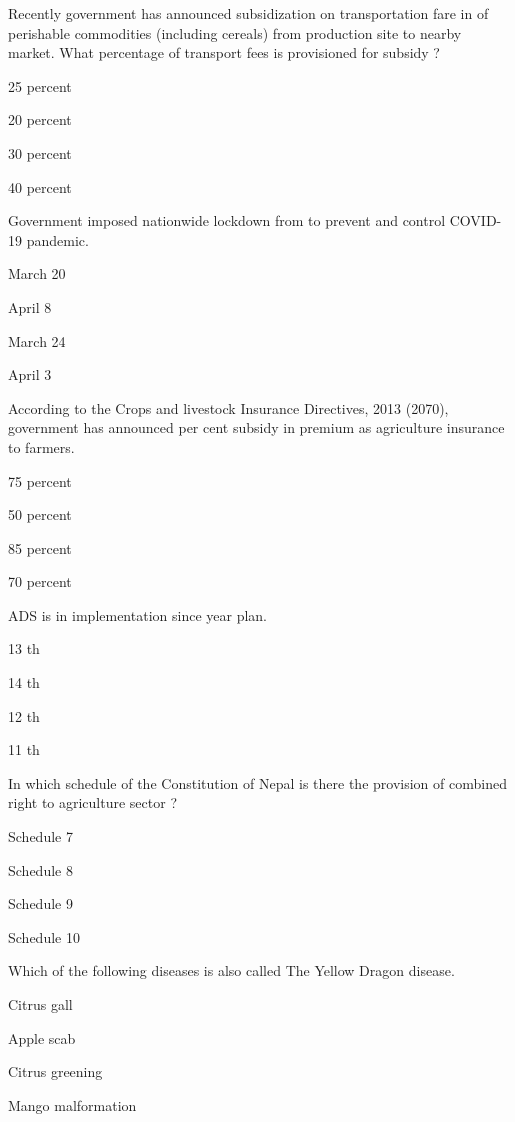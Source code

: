 \begin{questions}
\question Recently government has announced subsidization on transportation fare in of perishable commodities (including cereals) from production site to nearby market. What percentage of transport fees is provisioned for subsidy ?
\begin{items}
\item* 25 percent
\item 20 percent
\item 30 percent
\item 40 percent
\end{items}

\question Government imposed nationwide lockdown from \fillin[][3cm] to prevent and control COVID-19 pandemic.
\begin{items}
\item March 20
\item April 8
\item* March 24
\item April 3
\end{items}

\question According to the Crops and livestock Insurance Directives, 2013 (2070), government has announced \fillin[][3cm] per cent subsidy in premium as agriculture insurance to farmers.
\begin{items}
\item 75 percent
\item* 50 percent
\item 85 percent
\item 70 percent
\end{items}

\question ADS is in implementation since \fillin[][3cm] year plan.
\begin{items}
\item* 13 th
\item 14 th
\item 12 th
\item 11 th
\end{items}

\question In which schedule of the Constitution of Nepal is there the provision of combined right to agriculture sector ?
\begin{items}
\item Schedule 7
\item Schedule 8
\item* Schedule 9
\item Schedule 10
\end{items}

\question Which of the following diseases is also called The Yellow Dragon disease.
\begin{items}
\item Citrus gall
\item Apple scab
\item* Citrus greening
\item Mango malformation
\end{items}


\end{questions}
